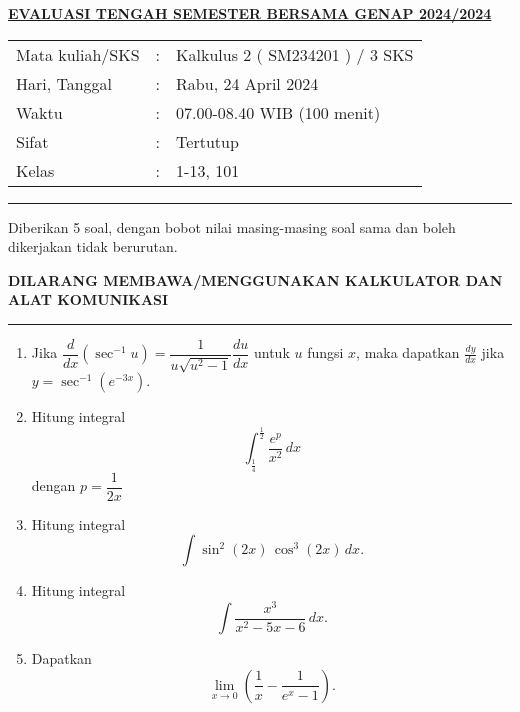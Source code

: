 \documentclass[11pt,openany,a4paper]{article}
\begin{document}
\pagestyle{problems}
    \begin{center}
	{\underline{\textbf{\MakeUppercase{Evaluasi Tengah Semester Bersama Genap 2024/2024}}}}
    \end{center}

    \begin{center}
	\begin{tabular}{lcl}
		Mata kuliah/SKS & : & Kalkulus 2 ( SM234201 ) / 3 SKS\\
		Hari, Tanggal & : & Rabu, 24 April 2024\\
		Waktu & : & 07.00-08.40 WIB (100 menit)\\
		Sifat & : & Tertutup\\
		Kelas & : & 1-13, 101
	\end{tabular}
    \end{center}
	
    \noindent\rule{\textwidth}{2.pt}
	
    \setlength{\parindent}{5pt}
    \par Diberikan 5 soal, dengan bobot nilai masing-masing soal sama dan boleh dikerjakan tidak berurutan.
    \setlength{\parindent}{5pt}
    \setlength{\parindent}{5pt}
    {\small
    \par \textbf{\MakeUppercase{Dilarang membawa/menggunakan kalkulator dan alat komunikasi}}
    }
    \par {}
	
    \noindent\rule{\textwidth}{2.pt}
	
\begin{enumerate}
  \item
    Jika 
    $
      \dfrac{d}{dx}\left(\sec^{-1}u\right)
      = \dfrac{1}{u\sqrt{u^2-1}}\dfrac{du}{dx}
    $
    untuk \(u\) fungsi \(x\), maka dapatkan \(\displaystyle \frac{dy}{dx}\) jika 
    $
      y = \sec^{-1}\left(e^{-3x}\right).
    $
    
  \item Hitung integral
    \[
      \int_{\frac14}^{\frac12} \frac{e^p}{x^2}\,dx
    \]
    dengan $p=\dfrac{1}{2x}$
    
  \item Hitung integral
    \[
      \int \sin^2(2x)\,\cos^3(2x)\,dx.
    \]
    
  \item Hitung integral
    \[
      \int \frac{x^3}{x^2 - 5x - 6}\,dx.
    \]
    
  \item Dapatkan
    \[
      \lim_{x\to 0}\left(\frac{1}{x} - \frac{1}{e^x - 1}\right).
    \]
\end{enumerate}
	
\end{document}
